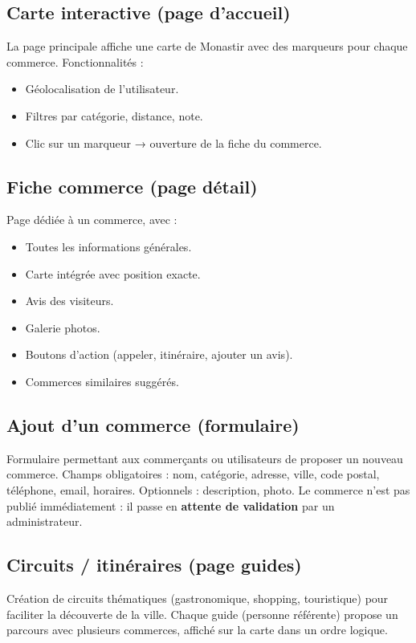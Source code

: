 \documentclass[a4paper,12pt]{article}
\begin{document}
\subsection{Carte interactive (page d’accueil)}
La page principale affiche une carte de Monastir avec des marqueurs pour chaque commerce.  
Fonctionnalités :
\begin{itemize}
    \item Géolocalisation de l’utilisateur.
    \item Filtres par catégorie, distance, note.
    \item Clic sur un marqueur → ouverture de la fiche du commerce.
\end{itemize}

\subsection{Fiche commerce (page détail)}
Page dédiée à un commerce, avec :
\begin{itemize}
    \item Toutes les informations générales.
    \item Carte intégrée avec position exacte.
    \item Avis des visiteurs.
    \item Galerie photos.
    \item Boutons d’action (appeler, itinéraire, ajouter un avis).
    \item Commerces similaires suggérés.
\end{itemize}

\subsection{Ajout d’un commerce (formulaire)}
Formulaire permettant aux commerçants ou utilisateurs de proposer un nouveau commerce.  
Champs obligatoires : nom, catégorie, adresse, ville, code postal, téléphone, email, horaires.  
Optionnels : description, photo.  
Le commerce n’est pas publié immédiatement : il passe en \textbf{attente de validation} par un administrateur.

\subsection{Circuits / itinéraires (page guides)}
Création de circuits thématiques (gastronomique, shopping, touristique) pour faciliter la découverte de la ville.  
Chaque guide (personne référente) propose un parcours avec plusieurs commerces, affiché sur la carte dans un ordre logique.
\end{document}
